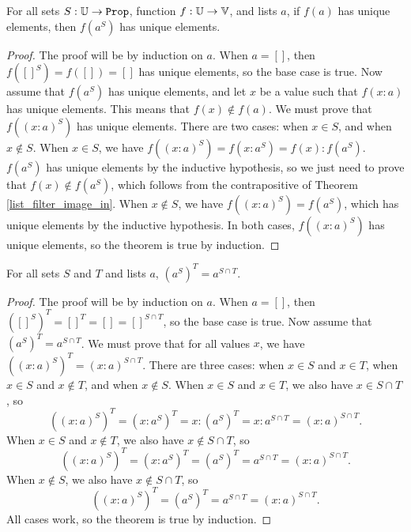 \documentclass[../../math.tex]{subfiles}
\begin{document}
\begin{theorem} \label{list_filter_image_unique}
    For all sets $S : \set{\U}$, function $f : \mathbb{U} \to \mathbb{V}$, and lists $a$, if
    $f(a)$ has unique elements, then $f(a^S)$ has unique elements.
\end{theorem}
\begin{proof}
    The proof will be by induction on $a$.  When $a = []$, then $f([]^S) = f([])
    = []$ has unique elements, so the base case is true.  Now assume that
    $f(a^S)$ has unique elements, and let $x$ be a value such that $f(x : a)$
    has unique elements.  This means that $f(x) \notin f(a)$.  We must prove
    that $f((x : a)^S)$ has unique elements.  There are two cases: when $x \in
    S$, and when $x \notin S$.  When $x \in S$, we have $f((x : a)^S) = f(x :
    a^S) = f(x) : f(a^S)$.  $f(a^S)$ has unique elements by the inductive
    hypothesis, so we just need to prove that $f(x) \notin f(a^S)$, which
    follows from the contrapositive of Theorem \ref{list_filter_image_in}.  When
    $x \notin S$, we have $f((x : a)^S) = f(a^S)$, which has unique elements by
    the inductive hypothesis.  In both cases, $f((x : a)^S)$ has unique
    elements, so the theorem is true by induction.
\end{proof}

\begin{theorem} \label{list_filter_inter}
    For all sets $S$ and $T$ and lists $a$, $(a^S)^T = a^{S \cap T}$.
\end{theorem}
\begin{proof}
    The proof will be by induction on $a$.  When $a = []$, then $([]^S)^T = []^T
    = [] = []^{S \cap T}$, so the base case is true.  Now assume that $(a^S)^T =
    a^{S \cap T}$.  We must prove that for all values $x$, we have $((x :
    a)^S)^T = (x : a)^{S \cap T}$.  There are three cases: when $x \in S$ and $x
    \in T$, when $x \in S$ and $x \notin T$, and when $x \notin S$.  When $x \in
    S$ and $x \in T$, we also have $x \in S \cap T$, so
    \[
        ((x : a)^S)^T = (x : a^S)^T = x : (a^S)^T = x : a^{S \cap T}
        = (x : a)^{S \cap T}.
    \]
    When $x \in S$ and $x \notin T$, we also have $x \notin S \cap T$, so
    \[
        ((x : a)^S)^T = (x : a^S)^T = (a^S)^T = a^{S \cap T}
        = (x : a)^{S \cap T}.
    \]
    When $x \notin S$, we also have $x \notin S \cap T$, so
    \[
        ((x : a)^S)^T = (a^S)^T = a^{S \cap T} = (x : a)^{S \cap T}.
    \]
    All cases work, so the theorem is true by induction.
\end{proof}
\end{document}
